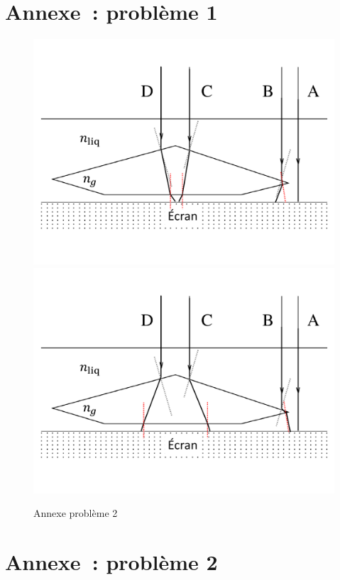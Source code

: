 \documentclass[a4paper, 10pt, garamond, oneside]{book}
\begin{document}
{	\newpage
	\chapter*{Annexe~: problème 1}

	\begin{figure}[htbp]
		\centering
		{\includegraphics[width=.7\linewidth]{gemme_c1}}
		{\includegraphics[width=.7\linewidth]{gemme_c2}}
		\caption{Annexe problème 2}
	\end{figure}

	\newpage
	\chapter*{Annexe~: problème 2}

}
\end{document}
